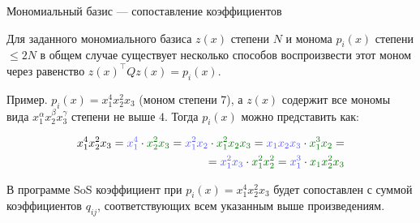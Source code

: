 \documentclass{beamer}
\begin{document}
\begin{frame}{Мономиальный базис — сопоставление коэффициентов}
	\begin{flushleft}
		
		Для заданного мономиального базиса $z(x)$ степени $N$ и монома $p_i(x)$ степени $\leq 2N$ в общем случае существует несколько способов воспроизвести этот моном через равенство $z(x)^\top Qz(x) = p_i(x)$.
		
		\bigskip
		
		Пример. $p_i(x) = x_1^4 x_2^2 x_3$ (моном степени 7), а $z(x)$ содержит все мономы вида $x_1^\alpha x_2^\beta x_3^\gamma$ степени не выше $4$. Тогда $p_i(x) $ можно представить как:
		
		\begin{align*}
			x_1^4 x_2^2 x_3 = 
			\textcolor{myblue}{x_1^4} \cdot \textcolor{mydarkgreen}{x_2^2 x_3} = 
			\textcolor{myblue}{x_1^2 x_2} \cdot \textcolor{mydarkgreen}{x_1^2 x_2 x_3} = 
			\textcolor{myblue}{x_1 x_2 x_3} \cdot \textcolor{mydarkgreen}{x_1^3 x_2} = \\ =
			\textcolor{myblue}{x_1^2 x_3} \cdot \textcolor{mydarkgreen}{x_1^2 x_2^2} = 
			\textcolor{myblue}{x_1^3} \cdot \textcolor{mydarkgreen}{x_1 x_2^2 x_3}
		\end{align*}
		
		В программе SoS коэффициент при $p_i(x) = x_1^4 x_2^2 x_3$ будет сопоставлен с суммой коэффициентов $q_{ij}$, соответствующих всем указанным выше произведениям.
		
		
	\end{flushleft}
\end{frame}
\end{document}
